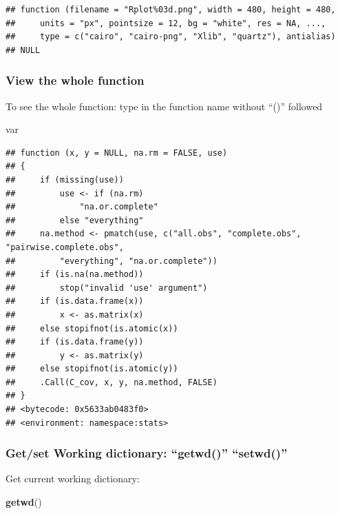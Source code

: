 \documentclass[]{article}
\newenvironment{Shaded}{\begin{snugshade}}{\end{snugshade}}
\newcommand{\KeywordTok}[1]{\textcolor[rgb]{0.13,0.29,0.53}{\textbf{#1}}}
\newcommand{\NormalTok}[1]{#1}
\begin{document}
\begin{verbatim}
## function (filename = "Rplot%03d.png", width = 480, height = 480, 
##     units = "px", pointsize = 12, bg = "white", res = NA, ..., 
##     type = c("cairo", "cairo-png", "Xlib", "quartz"), antialias) 
## NULL
\end{verbatim}

\hypertarget{view-the-whole-function}{%
\subsubsection{View the whole function}\label{view-the-whole-function}}

To see the whole function: type in the function name without ``()''
followed

\begin{Shaded}
\begin{Highlighting}[]
\NormalTok{var}
\end{Highlighting}
\end{Shaded}

\begin{verbatim}
## function (x, y = NULL, na.rm = FALSE, use) 
## {
##     if (missing(use)) 
##         use <- if (na.rm) 
##             "na.or.complete"
##         else "everything"
##     na.method <- pmatch(use, c("all.obs", "complete.obs", "pairwise.complete.obs", 
##         "everything", "na.or.complete"))
##     if (is.na(na.method)) 
##         stop("invalid 'use' argument")
##     if (is.data.frame(x)) 
##         x <- as.matrix(x)
##     else stopifnot(is.atomic(x))
##     if (is.data.frame(y)) 
##         y <- as.matrix(y)
##     else stopifnot(is.atomic(y))
##     .Call(C_cov, x, y, na.method, FALSE)
## }
## <bytecode: 0x5633ab0483f0>
## <environment: namespace:stats>
\end{verbatim}

\hypertarget{getset-working-dictionary-getwd-setwd}{%
\subsubsection{Get/set Working dictionary: ``getwd()''
``setwd()''}\label{getset-working-dictionary-getwd-setwd}}

Get current working dictionary:

\begin{Shaded}
\begin{Highlighting}[]
\KeywordTok{getwd}\NormalTok{()}
\end{Highlighting}
\end{Shaded}
\end{document}
